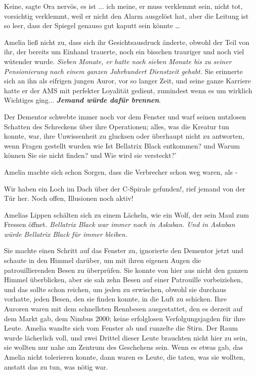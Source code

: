 \glqq{}Keine\grqq{}, sagte Ora nervös, \glqq{}es ist ... ich meine, er muss
verklemmt sein, nicht tot, vorsichtig verklemmt, weil er nicht den Alarm
ausgelöst hat, aber die Leitung ist so leer, dass der Spiegel genauso gut kaputt
sein könnte …\grqq{}

Amelia ließ nicht zu, dass sich ihr Gesichtsausdruck änderte, obwohl der Teil
von ihr, der bereits um Einhand trauerte, noch ein bisschen trauriger und noch
viel wütender wurde. \emph{Sieben Monate, er hatte noch sieben Monate bis zu
seiner Pensionierung nach einem ganzen Jahrhundert Dienstzeit gehabt.} Sie
erinnerte sich an ihn als eifrigen jungen Auror, vor so langer Zeit, und seine
ganze Karriere hatte er der AMS mit perfekter Loyalität gedient, zumindest wenn
es um wirklich Wichtiges ging... \textbf{\emph{Jemand würde dafür brennen}}.

Der Dementor schwebte immer noch vor dem Fenster und warf seinen nutzlosen
Schatten des Schreckens über ihre Operationen; alles, was die Kreatur tun
konnte, war, ihre Unwissenheit zu glucksen oder überhaupt nicht zu antworten,
wenn Fragen gestellt wurden wie \glqq{}Ist Bellatrix Black entkommen?\grqq{} und
\glqq{}Warum können Sie sie nicht finden?\grqq{} und \glqq{}Wie wird sie
versteckt?'

Amelia machte sich schon Sorgen, dass die Verbrecher schon weg waren, als -

\glqq{}Wir haben ein Loch im Dach über der C-Spirale gefunden!\grqq{}, rief
jemand von der Tür her. \glqq{}Noch offen, Illusionen noch aktiv!\grqq{}

Amelias Lippen schälten sich zu einem Lächeln, wie ein Wolf, der sein Maul zum
Fressen öffnet. \emph{Bellatrix Black war immer noch in Askaban. Und in Askaban
würde Bellatrix Black für immer bleiben.}

Sie machte einen Schritt auf das Fenster zu, ignorierte den Dementor jetzt und
schaute in den Himmel darüber, um mit ihren eigenen Augen die patrouillierenden
Besen zu überprüfen. Sie konnte von hier aus nicht den ganzen Himmel
überblicken, aber sie sah zehn Besen auf einer Patrouille vorbeiziehen, und das
sollte schon reichen, um jeden zu erwischen, obwohl sie durchaus vorhatte, jeden
Besen, den sie finden konnte, in die Luft zu schicken. Ihre Auroren waren mit
dem schnellsten Rennbesen ausgestattet, den es derzeit auf dem Markt gab, dem
Nimbus 2000; keine erfolglosen Verfolgungsjagden für ihre Leute. Amelia wandte
sich vom Fenster ab und runzelte die Stirn. Der Raum wurde lächerlich voll, und
zwei Drittel dieser Leute brauchten nicht hier zu sein, sie wollten nur nahe am
Zentrum des Geschehens sein. Wenn es etwas gab, das Amelia nicht tolerieren
konnte, dann waren es Leute, die taten, was sie wollten, anstatt das zu tun, was
nötig war.

